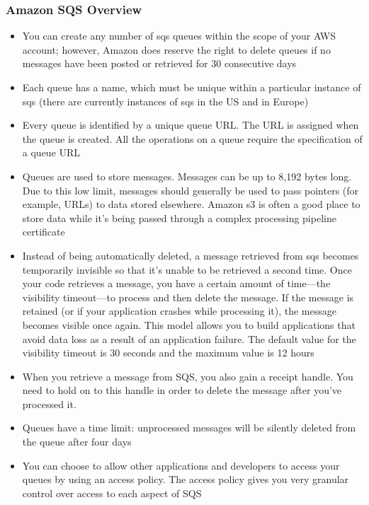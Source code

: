 \documentclass{beamer}
\begin{document}
\begin{frame}
\frametitle{Amazon SQS Overview}
\begin{itemize}
\item You can create any number of \acrshort{sqs} queues within the scope of your AWS account;
however, Amazon does reserve the right to delete queues if no messages have been
posted or retrieved for 30 consecutive days

\item Each queue has a name, which must be unique within a particular instance of \acrshort{sqs}
(there are currently instances of \acrshort{sqs} in the US and in Europe)
\item Every queue is identified by a unique queue URL. The URL is assigned when the
queue is created. All the operations on a queue require the specification of a queue
URL
\item Queues are used to store messages. Messages can be up to 8,192 bytes long. Due to
this low limit, messages should generally be used to pass pointers (for example,
URLs) to data stored elsewhere. Amazon \acrshort{s3} is often a good place to store data while
it’s being passed through a complex processing pipeline
certificate
\item Instead of being automatically deleted, a message retrieved from \acrshort{sqs} becomes
temporarily invisible so that it’s unable to be retrieved a second time. Once your
code retrieves a message, you have a certain amount of time—the visibility
timeout—to process and then delete the message. If the message is retained (or if
your application crashes while processing it), the message becomes visible once
again. This model allows you to build applications that avoid data loss as a result
of an application failure. The default value for the visibility timeout is 30 seconds
and the maximum value is 12 hours

\item When you retrieve a message from SQS, you also gain a receipt handle. You need
to hold on to this handle in order to delete the message after you’ve processed it.

\item Queues have a time limit: unprocessed messages will be silently deleted from the
queue after four days

\item You can choose to allow other applications and developers to access your queues
by using an access policy. The access policy gives you very granular control over
access to each aspect of SQS

\end{itemize}

\end{frame}
\end{document}
